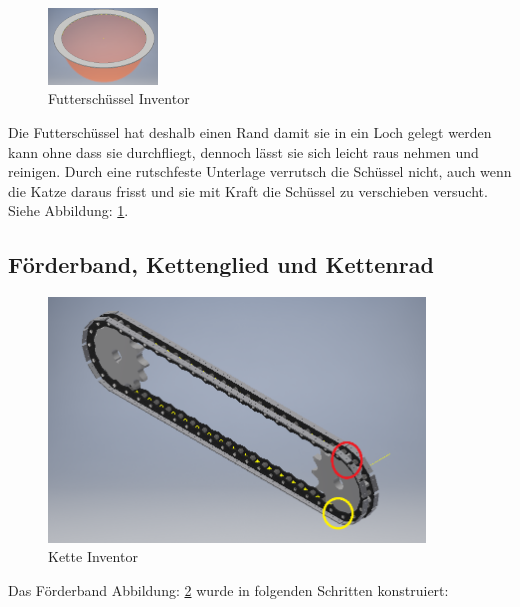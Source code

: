 \begin{figure}
\vspace{-20pt}
  \begin{center}
    \includegraphics[width=0.26\textwidth]{Bilder/Inventor/Schuessel}
  \end{center}
  \caption{Futterschüssel Inventor}
  \label{Futterschuessel_Inventor}
  \vspace{-10pt}
\end{figure}

Die Futterschüssel hat deshalb einen Rand damit sie in ein Loch gelegt werden kann ohne dass sie durchfliegt, dennoch lässt sie sich leicht raus nehmen und reinigen. Durch eine rutschfeste Unterlage verrutsch die Schüssel nicht, auch wenn die Katze daraus frisst und sie mit Kraft die Schüssel zu verschieben versucht. Siehe Abbildung: \ref{Futterschuessel_Inventor}.

\subsection{Förderband, Kettenglied und Kettenrad}

\begin{figure}[H]
\begin{center}
\includegraphics[width=10cm]{Bilder/Inventor/Kette}
\caption{Kette Inventor}
\label{Kette_Inventor} 
\end{center}
\end{figure}


Das Förderband Abbildung: \ref{Kette_Inventor} wurde in folgenden Schritten konstruiert: 

